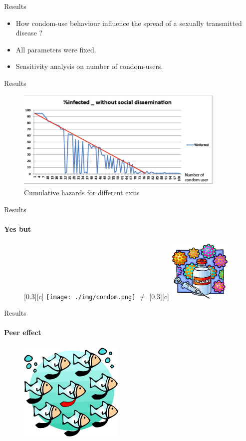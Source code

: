 \documentclass{beamer}
\begin{document}
\begin{frame}{Results}
	\begin{itemize}[<+->]
		\item How condom-use behaviour influence the spread of a sexually transmitted disease ?
		\item All parameters were fixed.
		\item Sensitivity analysis on number of condom-users.
	\end{itemize}
\end{frame}

\begin{frame}{Results}
	\begin{figure}[H]
		\centering
		\includegraphics[width=10.0cm]{./img/infected_withoutsocialdissemination.pdf} 
		\caption{Cumulative hazards for different exits}
	\end{figure} 
\end{frame}

\begin{frame}{Results}
\framesubtitle{\bf{Yes but}}
	\begin{figure}[H]
		\centering
		\subcaptionbox{}[0.3\linewidth][c]{
		\texttt{[image: ./img/condom.png]}
		}
		$\neq$
		\subcaptionbox{}[0.3\linewidth][c]{
		\includegraphics[width=3.0cm, heigth=3.0cm]{./img/vaccin.png}
		}
	\end{figure}  
\end{frame}

\begin{frame}{Results}
	\framesubtitle{\bf{Peer effect}}
	\begin{figure}[H]
		\centering
		\includegraphics[width=5.0cm, heigth=5.cm]{./img/peereffect.png}
	\end{figure} 
\end{frame}
\end{document}
